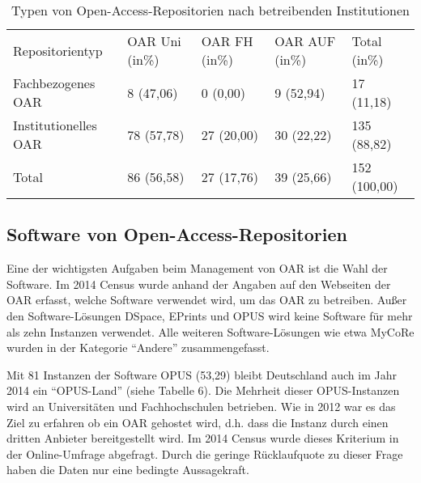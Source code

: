 \documentclass[a4paper,
fontsize=11pt,
oneside,
numbers=noperiodatend,
parskip=half-,
bibliography=totoc,
final
]{scrartcl}
\begin{document}
\begin{table}[ht]
\centering
\small
\begin{tabular}{lllll}
  \toprule
Repositorientyp &  OAR Uni (in\%)   & OAR FH (in\%)  & OAR AUF (in\%)  & Total (in\%) \\ 
     \cmidrule(r){1-1} \cmidrule(r){2-2} \cmidrule(r){3-3} \cmidrule(r){4-4} \cmidrule(r){5-5}
Fachbezogenes OAR & 8 (47,06) & 0 (0,00) & 9 (52,94) & 17 (11,18) \\ 
  Institutionelles OAR & 78 (57,78) & 27 (20,00) & 30 (22,22) & 135 (88,82) \\ 
     \cmidrule(r){1-1} \cmidrule(r){2-2} \cmidrule(r){3-3} \cmidrule(r){4-4} \cmidrule(r){5-5}
  Total & 86 (56,58) & 27 (17,76) & 39 (25,66) & 152 (100,00) \\ 
   \bottomrule
\end{tabular}
\caption{Typen von Open-Access-Repositorien nach betreibenden
Institutionen}
\end{table}

\subsection*{Software von
Open-Access-Repositorien}\label{software-von-open-access-repositorien}

Eine der wichtigsten Aufgaben beim Management von OAR ist die Wahl der
Software. Im 2014 Census wurde anhand der Angaben auf den Webseiten der
OAR erfasst, welche Software verwendet wird, um das OAR zu betreiben.
Außer den Software-Lösungen DSpace, EPrints und OPUS wird keine Software
für mehr als zehn Instanzen verwendet. Alle weiteren Software-Lösungen
wie etwa MyCoRe wurden in der Kategorie \enquote{Andere}
zusammengefasst.

Mit 81 Instanzen der Software OPUS (53,29) bleibt Deutschland auch im
Jahr 2014 ein \enquote{OPUS-Land} (siehe Tabelle 6). Die Mehrheit dieser
OPUS-Instanzen wird an Universitäten und Fachhochschulen betrieben. Wie
in 2012 war es das Ziel zu erfahren ob ein OAR gehostet wird, d.h. dass
die Instanz durch einen dritten Anbieter bereitgestellt wird. Im 2014
Census wurde dieses Kriterium in der Online-Umfrage abgefragt. Durch die
geringe Rücklaufquote zu dieser Frage haben die Daten nur eine bedingte
Aussagekraft.
\end{document}
